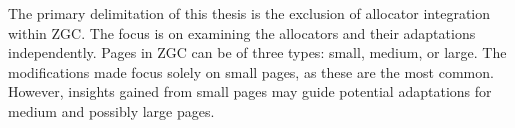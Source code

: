 The primary delimitation of this thesis is the exclusion of allocator integration within ZGC. The focus is on examining the allocators and their adaptations independently. Pages in ZGC can be of three types: small, medium, or large. The modifications made focus solely on small pages, as these are the most common. However, insights gained from small pages may guide potential adaptations for medium and possibly large pages.


